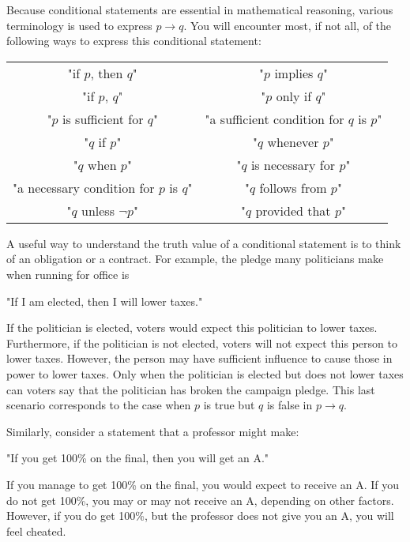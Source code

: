 \documentclass{Axon}
\begin{document}
Because conditional statements are essential in mathematical reasoning, various terminology is used to express \(p \to q\). You will encounter most, if not all, of the following ways to express this conditional statement:

\begin{table*}[h]
    \centering
    \begin{tabular}{cc}
        "if \(p\), then \(q\)"                     & "\(p\) implies \(q\)"                       \\
        "if \(p\), \(q\)"                          & "\(p\) only if \(q\)"                       \\
        "\(p\) is sufficient for \(q\)"            & "a sufficient condition for \(q\) is \(p\)" \\
        "\(q\) if \(p\)"                           & "\(q\) whenever \(p\)"                      \\
        "\(q\) when \(p\)"                         & "\(q\) is necessary for \(p\)"              \\
        "a necessary condition for \(p\) is \(q\)" & "\(q\) follows from \(p\)"                  \\
        "\(q\) unless \(\lnot p\)"                 & "\(q\) provided that \(p\)"                 \\
    \end{tabular}
\end{table*}

A useful way to understand the truth value of a conditional statement is to think of an obligation or a contract. For example, the pledge many politicians make when running for office is
\begin{center}
    "If I am elected, then I will lower taxes."
\end{center}
If the politician is elected, voters would expect this politician to lower taxes. Furthermore, if the politician is not elected, voters will not expect this person to lower taxes. However, the person may have sufficient influence to cause those in power to lower taxes. Only when the politician is elected but does not lower taxes can voters say that the politician has broken the campaign pledge. This last scenario corresponds to the case when \(p\) is true but \(q\) is false in \(p \to q\).

Similarly, consider a statement that a professor might make:
\begin{center}
    "If you get 100\% on the final, then you will get an A."
\end{center}
If you manage to get 100\% on the final, you would expect to receive an A. If you do not get 100\%, you may or may not receive an A, depending on other factors. However, if you do get 100\%, but the professor does not give you an A, you will feel cheated.
\end{document}

